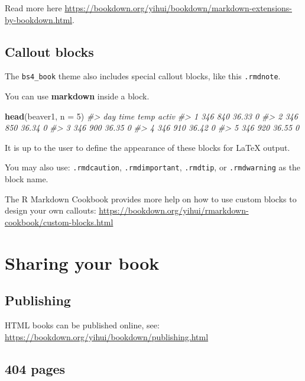 \documentclass[
]{report}
\newenvironment{Shaded}{\begin{snugshade}}{\end{snugshade}}
\newcommand{\AttributeTok}[1]{\textcolor[rgb]{0.13,0.29,0.53}{#1}}
\newcommand{\CommentTok}[1]{\textcolor[rgb]{0.56,0.35,0.01}{\textit{#1}}}
\newcommand{\DecValTok}[1]{\textcolor[rgb]{0.00,0.00,0.81}{#1}}
\newcommand{\FunctionTok}[1]{\textcolor[rgb]{0.13,0.29,0.53}{\textbf{#1}}}
\newcommand{\NormalTok}[1]{#1}
\theoremstyle{definition}
\theoremstyle{definition}
\theoremstyle{definition}
\theoremstyle{definition}
\theoremstyle{remark}
\begin{document}
Read more here \url{https://bookdown.org/yihui/bookdown/markdown-extensions-by-bookdown.html}.

\hypertarget{callout-blocks}{%
\section{Callout blocks}\label{callout-blocks}}

The \texttt{bs4\_book} theme also includes special callout blocks, like this \texttt{.rmdnote}.

You can use \textbf{markdown} inside a block.

\begin{Shaded}
\begin{Highlighting}[]
\FunctionTok{head}\NormalTok{(beaver1, }\AttributeTok{n =} \DecValTok{5}\NormalTok{)}
\CommentTok{\#\textgreater{}   day time  temp activ}
\CommentTok{\#\textgreater{} 1 346  840 36.33     0}
\CommentTok{\#\textgreater{} 2 346  850 36.34     0}
\CommentTok{\#\textgreater{} 3 346  900 36.35     0}
\CommentTok{\#\textgreater{} 4 346  910 36.42     0}
\CommentTok{\#\textgreater{} 5 346  920 36.55     0}
\end{Highlighting}
\end{Shaded}

It is up to the user to define the appearance of these blocks for LaTeX output.

You may also use: \texttt{.rmdcaution}, \texttt{.rmdimportant}, \texttt{.rmdtip}, or \texttt{.rmdwarning} as the block name.

The R Markdown Cookbook provides more help on how to use custom blocks to design your own callouts: \url{https://bookdown.org/yihui/rmarkdown-cookbook/custom-blocks.html}

\hypertarget{sharing-your-book}{%
\chapter{Sharing your book}\label{sharing-your-book}}

\hypertarget{publishing}{%
\section{Publishing}\label{publishing}}

HTML books can be published online, see: \url{https://bookdown.org/yihui/bookdown/publishing.html}

\hypertarget{pages}{%
\section{404 pages}\label{pages}}
\end{document}
